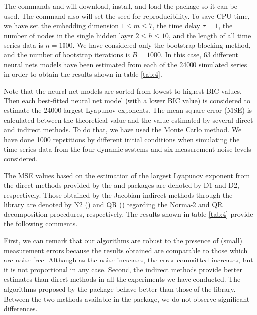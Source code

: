 The commands  and  will download, install, and load the  package so it can be used. The command  also will set the seed for reproducibility. To save CPU time, we have set the embedding dimension $1 \leqslant m \leqslant 7$, the time delay $\tau = 1$, the number of nodes in the single hidden layer  $2 \leqslant h \leqslant 10$, and the length of all time series data is $n = 1000$. We have considered only the bootstrap blocking method, and the number of bootstrap iterations is $B = 1000$. In this case, 63 different neural nets models have been estimated from each of the 24000 simulated series in order to obtain the results shown in table \ref{tab:4}. 

Note that the neural net models are sorted from lowest to highest BIC values. Then each best-fitted neural net model (with a lower BIC value) is considered to estimate the 24000 largest Lyapunov exponents. The mean square error (MSE) is calculated between the theoretical value and the value estimated by several direct and indirect methods. To do that, we have used the Monte Carlo method. We have done 1000 repetitions by different initial conditions when simulating the time-series data from the four dynamic systems and six measurement noise levels considered. 

The MSE values based on the estimation of the largest Lyapunov exponent from the direct methods provided by the  and  packages are denoted by D1 and D2, respectively. Those obtained by the Jacobian indirect methods through the  library are denoted by N2 () and QR () regarding the Norma-2 and QR decomposition procedures, respectively. The results shown in table \ref{tab:4} provide the following comments. 

First, we can remark that our algorithms are robust to the presence of (small) measurement errors because the results obtained are comparable to those which are noise-free. Although as the noise increases, the error committed increases, but it is not proportional in any case. Second, the indirect methods provide better estimates than direct methods in all the experiments we have conducted. The algorithms proposed by the  package behave better than those of the  library. Between the two methods available in the  package, we do not observe significant differences. 

